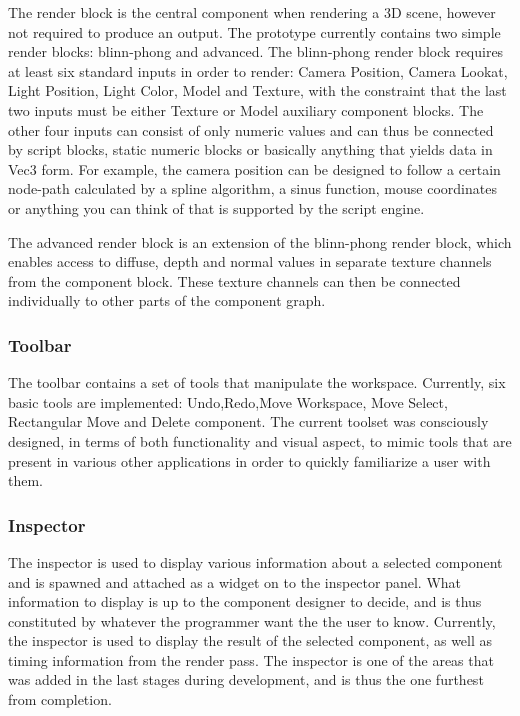 The render block is the central component when rendering a 3D scene, however not required to produce an output. The prototype currently contains two simple render blocks: blinn-phong and advanced. The blinn-phong render block requires at least six standard inputs in order to render: Camera Position, Camera Lookat, Light Position, Light Color, Model and Texture, with the constraint that the last two inputs must be either Texture or Model auxiliary component blocks. The other four inputs can consist of only numeric values and can thus be connected by script blocks, static numeric blocks or basically anything that yields data in Vec3 form. For example, the camera position can be designed to follow a certain node-path calculated by a spline algorithm, a sinus function, mouse coordinates or anything you can think of that is supported by the script engine. 

The advanced render block is an extension of the blinn-phong render block, which enables access to diffuse, depth and normal values in separate texture channels from the component block. These texture channels can then be connected individually to other parts of the component graph. 

\subsubsection{Toolbar}
The toolbar contains a set of tools that manipulate the workspace. Currently, six basic tools are implemented: Undo,Redo,Move Workspace, Move Select, Rectangular Move and Delete component. The current toolset was consciously designed, in terms of both functionality and visual aspect, to mimic tools that are present in various other applications in order to quickly familiarize a user with them.

\subsubsection{Inspector}
The inspector is used to display various information about a selected component and is spawned and attached as a widget on to the inspector panel. What information to display is up to the component designer to decide, and is thus constituted by whatever the programmer want the the user to know. Currently, the inspector is used to display the result of the selected component, as well as timing information from the render pass. The inspector is one of the areas that was added in the last stages during development, and is thus the one furthest from completion. 
 